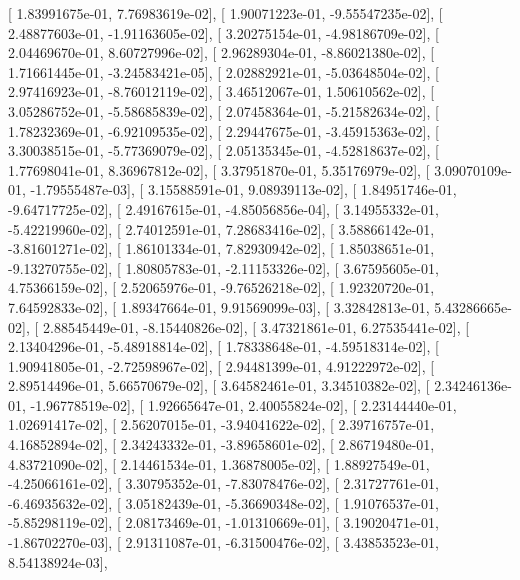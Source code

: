 \documentclass{article}
\begin{document}
       [  1.83991675e-01,   7.76983619e-02],
       [  1.90071223e-01,  -9.55547235e-02],
       [  2.48877603e-01,  -1.91163605e-02],
       [  3.20275154e-01,  -4.98186709e-02],
       [  2.04469670e-01,   8.60727996e-02],
       [  2.96289304e-01,  -8.86021380e-02],
       [  1.71661445e-01,  -3.24583421e-05],
       [  2.02882921e-01,  -5.03648504e-02],
       [  2.97416923e-01,  -8.76012119e-02],
       [  3.46512067e-01,   1.50610562e-02],
       [  3.05286752e-01,  -5.58685839e-02],
       [  2.07458364e-01,  -5.21582634e-02],
       [  1.78232369e-01,  -6.92109535e-02],
       [  2.29447675e-01,  -3.45915363e-02],
       [  3.30038515e-01,  -5.77369079e-02],
       [  2.05135345e-01,  -4.52818637e-02],
       [  1.77698041e-01,   8.36967812e-02],
       [  3.37951870e-01,   5.35176979e-02],
       [  3.09070109e-01,  -1.79555487e-03],
       [  3.15588591e-01,   9.08939113e-02],
       [  1.84951746e-01,  -9.64717725e-02],
       [  2.49167615e-01,  -4.85056856e-04],
       [  3.14955332e-01,  -5.42219960e-02],
       [  2.74012591e-01,   7.28683416e-02],
       [  3.58866142e-01,  -3.81601271e-02],
       [  1.86101334e-01,   7.82930942e-02],
       [  1.85038651e-01,  -9.13270755e-02],
       [  1.80805783e-01,  -2.11153326e-02],
       [  3.67595605e-01,   4.75366159e-02],
       [  2.52065976e-01,  -9.76526218e-02],
       [  1.92320720e-01,   7.64592833e-02],
       [  1.89347664e-01,   9.91569099e-03],
       [  3.32842813e-01,   5.43286665e-02],
       [  2.88545449e-01,  -8.15440826e-02],
       [  3.47321861e-01,   6.27535441e-02],
       [  2.13404296e-01,  -5.48918814e-02],
       [  1.78338648e-01,  -4.59518314e-02],
       [  1.90941805e-01,  -2.72598967e-02],
       [  2.94481399e-01,   4.91222972e-02],
       [  2.89514496e-01,   5.66570679e-02],
       [  3.64582461e-01,   3.34510382e-02],
       [  2.34246136e-01,  -1.96778519e-02],
       [  1.92665647e-01,   2.40055824e-02],
       [  2.23144440e-01,   1.02691417e-02],
       [  2.56207015e-01,  -3.94041622e-02],
       [  2.39716757e-01,   4.16852894e-02],
       [  2.34243332e-01,  -3.89658601e-02],
       [  2.86719480e-01,   4.83721090e-02],
       [  2.14461534e-01,   1.36878005e-02],
       [  1.88927549e-01,  -4.25066161e-02],
       [  3.30795352e-01,  -7.83078476e-02],
       [  2.31727761e-01,  -6.46935632e-02],
       [  3.05182439e-01,  -5.36690348e-02],
       [  1.91076537e-01,  -5.85298119e-02],
       [  2.08173469e-01,  -1.01310669e-01],
       [  3.19020471e-01,  -1.86702270e-03],
       [  2.91311087e-01,  -6.31500476e-02],
       [  3.43853523e-01,   8.54138924e-03],
\end{document}
